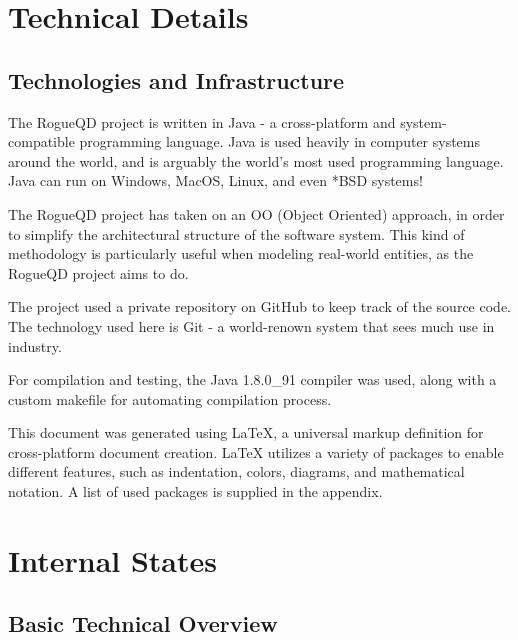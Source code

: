 \documentclass{article}
\begin{document}

\section{Technical Details} %

	\subsection{Technologies and Infrastructure}

		The RogueQD project is written in Java - a cross-platform and system-compatible programming language. Java is used heavily in computer systems around the world, and is arguably the world's most used programming language. Java can run on Windows, MacOS, Linux, and even *BSD systems!

		\bigskip

		The RogueQD project has taken on an OO (Object Oriented) approach, in order to simplify the architectural structure of the software system. This kind of methodology is particularly useful when modeling real-world entities, as the RogueQD project aims to do.

		\bigskip

		The project used a private repository on GitHub to keep track of the source code. The technology used here is Git - a world-renown system that sees much use in industry.

		\bigskip

		For compilation and testing, the Java 1.8.0\_91 compiler was used, along with a custom makefile for automating compilation process.

		\bigskip

		This document was generated using LaTeX, a universal markup definition for cross-platform document creation. LaTeX utilizes a variety of packages to enable different features, such as indentation, colors, diagrams, and mathematical notation. A list of used packages is supplied in the appendix.


\section{Internal States} %

	\subsection{Basic Technical Overview}
\end{document}
